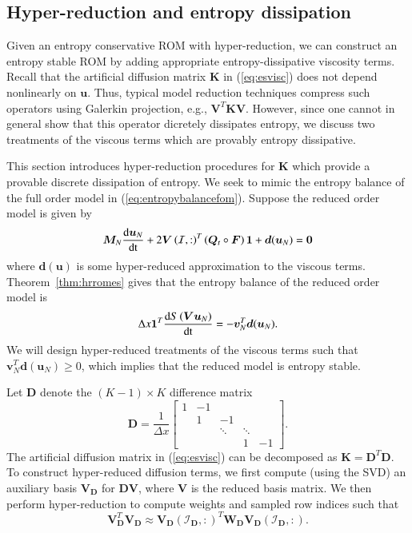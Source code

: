 \documentclass[preprint,10pt]{elsarticle}
\theoremstyle{definition}
\theoremstyle{lemma}
\theoremstyle{theorem}
\theoremstyle{assumption}
\newcommand{\td}[2]{\frac{{\rm d}#1}{{\rm d}{\rm #2}}}
\newcommand{\LRp}[1]{\left( #1 \right)}
\begin{document}
\subsection{Hyper-reduction and entropy dissipation}
\label{sec:diss}

Given an entropy conservative ROM with hyper-reduction, we can construct an entropy stable ROM by adding appropriate entropy-dissipative viscosity terms.  Recall that the artificial diffusion matrix $\bm{K}$ in (\ref{eq:esvisc}) does not depend nonlinearly on $\bm{u}$.  Thus, typical model reduction techniques compress such operators using Galerkin projection, e.g., $\bm{V}^T\bm{K}\bm{V}$.  However, since one cannot in general show that this operator dicretely dissipates entropy, we discuss two treatments of the viscous terms which are provably entropy dissipative.  

This section introduces hyper-reduction procedures for $\bm{K}$ which provide a provable discrete dissipation of entropy.  We seek to mimic the entropy balance of the full order model in (\ref{eq:entropybalancefom}).  Suppose the reduced order model is given by 
\[
\bm{M}_N\td{\bm{u}_N}{t} + 2\bm{V}\LRp{\mathcal{I},:}^T\LRp{\bm{Q}_t \circ \bm{F}}\bm{1} + \bm{d}(\bm{u}_N)= \bm{0}
\]
where $\bm{d}(\bm{u})$ is some hyper-reduced approximation to the viscous terms.  Theorem~\ref{thm:hrromes} gives that the entropy balance of the reduced order model is
\[
\Delta x \bm{1}^T\td{S\LRp{\bm{V}\bm{u}_N}}{t} = -\bm{v}_N^T\bm{d}(\bm{u}_N).
\]
We will design hyper-reduced treatments of the viscous terms such that $\bm{v}_N^T\bm{d}(\bm{u}_N) \geq 0$, which implies that the reduced model is entropy stable.  

Let $\bm{D}$ denote the $(K-1)\times K$ difference matrix
\[
\bm{D} = \frac{1}{\Delta x}\begin{bmatrix}
1 & -1 &&& \\
 & 1 & -1 && \\
 & & \ddots & \ddots&\\
&  & & 1 & -1
\end{bmatrix}.
\]
The artificial diffusion matrix in (\ref{eq:esvisc}) can be decomposed as $\bm{K} = \bm{D}^T\bm{D}$.  To construct hyper-reduced diffusion terms, we first compute (using the SVD) an auxiliary basis $\bm{V}_{\bm{D}}$ for $\bm{D}\bm{V}$, where $\bm{V}$ is the reduced basis matrix.  We then perform hyper-reduction to compute weights and sampled row indices such that 
\[
\bm{V}_{\bm{D}}^T\bm{V}_{\bm{D}} \approx \bm{V}_{\bm{D}}\LRp{\mathcal{I}_{\bm{D}},:}^T \bm{W}_{\bm{D}}\bm{V}_{\bm{D}}\LRp{\mathcal{I}_{\bm{D}},:}.
\]
\end{document}

